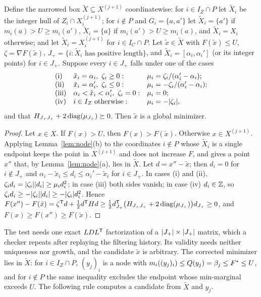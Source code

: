 \begin{proposition}\label{prop:local}
Define the narrowed box $\tilde X\subseteq X^{(j+1)}$ coordinatewise: for
$i\in I_Z\cap P$ let $\tilde X_i$ be the integer hull of
$Z_i\cap X^{(j+1)}_i$; for $i\notin P$ and $G_i=\{a,a'\}$ let
$\tilde X_i=\{a'\}$ if $m_i(a)>U\ge m_i(a')$, $\tilde X_i=\{a\}$ if
$m_i(a')>U\ge m_i(a)$, and $\tilde X_i=X_i$ otherwise; and let
$\tilde X_i=X^{(j+1)}_i$ for $i\in I_C\cap P$. Let $\tilde x\in\tilde X$
with $F(\tilde x)\le U$, $\zeta=\nabla F(\tilde x)$,
$J_+=\{i:\tilde X_i\text{ has positive length}\}$, and
$\tilde X_i=[\alpha_i,\alpha_i']$ (or its integer points) for $i\in J_+$.
Suppose every $i\in J_+$ falls under one of the cases
\[
\begin{array}{lll}
\text{(i)}&\tilde x_i=\alpha_i,\ \zeta_i\ge0:&\mu_i=\zeta_i/(\alpha_i'-\alpha_i);\\
\text{(ii)}&\tilde x_i=\alpha_i',\ \zeta_i\le0:&\mu_i=-\zeta_i/(\alpha_i'-\alpha_i);\\
\text{(iii)}&\alpha_i<\tilde x_i<\alpha_i',\ \zeta_i=0:&\mu_i=0;\\
\text{(iv)}&i\in I_Z\text{ otherwise}:&\mu_i=-\abs{\zeta_i},
\end{array}
\]
and that $H_{J_+J_+}+2\operatorname{diag}(\mu_{J_+})\succeq0$. Then $\tilde x$ is a global
minimizer.
\end{proposition}

\begin{proof}
Let $x\in X$. If $F(x)>U$, then $F(x)>F(\tilde x)$. Otherwise
$x\in X^{(j+1)}$. Applying Lemma~\ref{lem:node}(b) to the coordinates
$i\notin P$ whose $\tilde X_i$ is a single endpoint keeps the point in
$X^{(j+1)}$ and does not increase $F$, and gives a point $x''$ that, by
Lemma~\ref{lem:node}(a), lies in $\tilde X$. Let $d=x''-\tilde x$; then
$d_i=0$ for $i\notin J_+$ and $\alpha_i-\tilde x_i\le d_i\le\alpha_i'-\tilde x_i$
for $i\in J_+$. In cases (i) and (ii),
$\zeta_id_i=\lvert \zeta_i\rvert\lvert d_i\rvert\ge\mu_id_i^2$; in case (iii) both sides
vanish; in case (iv) $d_i\in\mathbb Z$, so
$\zeta_id_i\ge-\lvert \zeta_i\rvert\lvert d_i\rvert\ge-\lvert \zeta_i\rvert d_i^2$. Hence
$F(x'')-F(\tilde x)=\zeta^\mathsf T d+\frac12d^\mathsf T Hd\ge\frac12d_{J_+}^\mathsf T\bigl(H_{J_+J_+}
+2\operatorname{diag}(\mu_{J_+})\bigr)d_{J_+}\ge0$, and $F(x)\ge F(x'')\ge F(\tilde x)$.
\end{proof}

The test needs one exact $LDL^\mathsf T$ factorization of a
$\lvert J_+\rvert\times\lvert J_+\rvert$ matrix, which a checker repeats after replaying the
filtering history. Its validity needs neither uniqueness nor growth, and the
candidate $\tilde x$ is arbitrary. The corrected minimizer lies in
$\tilde X$: for $i\in I_Z\cap P$, $(y_j)_i$ is a node with
$m_i((y_j)_i)\le Q(y_j)=\beta_j\le F^{*}\le U$, and for $i\notin P$ the same
inequality excludes the endpoint whose min-marginal exceeds $U$. The
following rule computes a candidate from $\tilde X$ and $y_j$.

